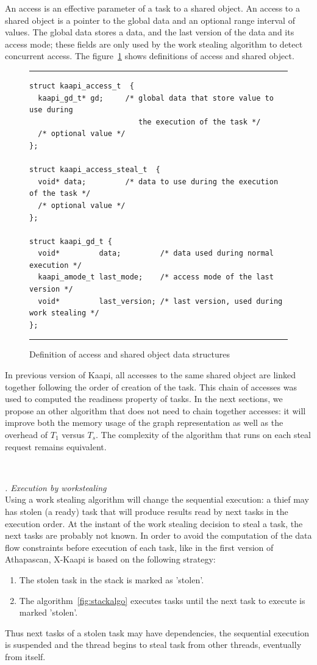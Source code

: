 \documentclass{report}
\newcommand{\kaapi}{\textsc{X}-Kaapi\xspace}
\renewcommand{\subsubsection}[1]{~\\ \addtocounter{subsubsection}{1} \noindent\textit{
\thesubsubsection. #1\\}}
\begin{document}
An access is an effective parameter of a task to a shared object.
An access to a shared object is a pointer to the global data and an optional range interval of values.
The global data stores a data, and the last version of the data and its access mode; these fields 
are only used by the work stealing algorithm to detect concurrent access.
The figure~\ref{fig:repobject} shows definitions of access and shared object.
\begin{figure}[!h]
\hrule
\small
\begin{verbatim}
struct kaapi_access_t  {
  kaapi_gd_t* gd;     /* global data that store value to use during
                         the execution of the task */
  /* optional value */
};

struct kaapi_access_steal_t  {
  void* data;         /* data to use during the execution of the task */
  /* optional value */
};

struct kaapi_gd_t {
  void*         data;         /* data used during normal execution */
  kaapi_amode_t last_mode;    /* access mode of the last version */
  void*         last_version; /* last version, used during work stealing */
};
\end{verbatim}
\hrule
\caption{Definition of access and shared object data structures}
\label{fig:repobject}
\end{figure}
In previous version of Kaapi, all accesses to the same shared object are linked together following the order of creation of the task. This chain of accesses was used to computed the readiness property of tasks. In the next sections, we propose an other algorithm that does not need to chain together accesses: it will improve both the memory usage of the graph representation as well as the overhead of $T_1$ versus $T_s$. The complexity of the algorithm that runs on each steal request remains equivalent.

\subsubsection{Execution by workstealing}
Using a work stealing algorithm will change the sequential execution: a thief may has stolen (a ready) task that will produce results read by next tasks in the execution order. At the instant of the work stealing decision to steal a task, the next tasks are probably not known. In order to avoid the computation of the data flow constraints before execution of each task, like in the first version of Athapascan, \kaapi is based on the following strategy:
\begin{enumerate}
\item The stolen task in the stack is marked as 'stolen'.
\item The algorithm~\ref{fig:stackalgo} executes tasks until the next task to execute is marked 'stolen'.
\end{enumerate}
Thus next tasks of a stolen task may have dependencies, the sequential execution is suspended and the thread begins to steal task from other threads, eventually from itself. 
\end{document}
